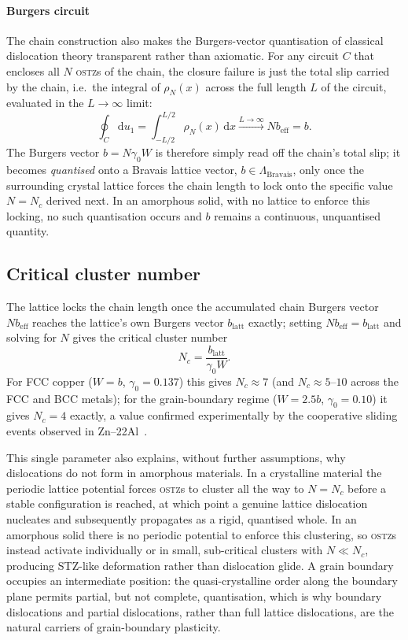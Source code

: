 \documentclass[3p]{elsarticle}
\newcommand{\OSTZ}{\textsc{ostz}}
\newcommand{\gz}{\gamma_0}
\newcommand{\beff}{b_\mathrm{eff}}
\begin{document}
\paragraph{Burgers circuit}
The chain construction also makes the Burgers-vector quantisation of
classical dislocation theory transparent rather than axiomatic. For
any circuit $C$ that encloses all $N$ \OSTZ s of the chain, the
closure failure is just the total slip carried by the chain, i.e.\
the integral of $\rho_N(x)$ across the full length $L$ of the
circuit, evaluated in the $L\to\infty$ limit:
\[
  \oint_C\mathrm du_1=\int_{-L/2}^{L/2}\rho_N(x)\,\mathrm dx
  \xrightarrow{L\to\infty}N\beff=b.
\]
The Burgers vector $b=N\gz W$ is therefore simply read off the
chain's total slip; it becomes \emph{quantised} onto a Bravais
lattice vector, $b\in\Lambda_\mathrm{Bravais}$, only once the
surrounding crystal lattice forces the chain length to lock onto the
specific value $N=N_c$ derived next. In an amorphous solid, with no
lattice to enforce this locking, no such quantisation occurs and $b$
remains a continuous, unquantised quantity.

\subsection{Critical cluster number}
\label{sec:Nc}

The lattice locks the chain length once the accumulated chain
Burgers vector $N\beff$ reaches the lattice's own Burgers vector
$b_\mathrm{latt}$ exactly; setting $N\beff=b_\mathrm{latt}$ and
solving for $N$ gives the critical cluster number
\begin{equation}
  \boxed{N_c=\frac{b_\mathrm{latt}}{\gz W}.}
  \label{eq:Nc}
\end{equation}
For FCC copper ($W=b$, $\gz=0.137$) this gives $N_c\approx7$ (and
$N_c\approx5$--$10$ across the FCC and BCC metals); for the
grain-boundary regime ($W=2.5b$, $\gz=0.10$) it gives $N_c=4$ exactly,
a value confirmed experimentally by the cooperative sliding events
observed in Zn--22Al~\citep{astanin-part2}.

This single parameter also explains, without further assumptions,
why dislocations do not form in amorphous materials. In a
crystalline material the periodic lattice potential forces \OSTZ s
to cluster all the way to $N=N_c$ before a stable configuration is
reached, at which point a genuine lattice dislocation nucleates and
subsequently propagates as a rigid, quantised whole. In an amorphous
solid there is no periodic potential to enforce this clustering, so
\OSTZ s instead activate individually or in small, sub-critical
clusters with $N\ll N_c$, producing STZ-like deformation rather than
dislocation glide. A grain boundary occupies an intermediate
position: the quasi-crystalline order along the boundary plane
permits partial, but not complete, quantisation, which is why
boundary dislocations and partial dislocations, rather than full
lattice dislocations, are the natural carriers of grain-boundary
plasticity.
\end{document}
